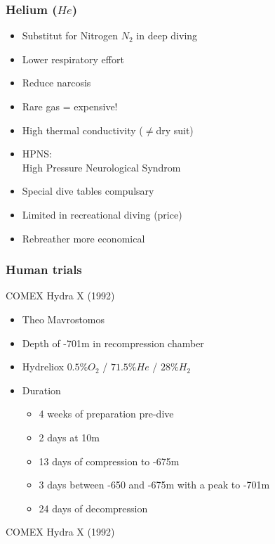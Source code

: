 \documentclass[aspectratio=1610,english,12pt]{beamer}
\begin{document}
\subsubsection{Helium ($He$)}
\begin{frame}{\insertsubsubsection}
	\begin{itemize}
		\item Substitut for Nitrogen $N_2$ in deep diving
		\item Lower respiratory effort
		\item Reduce narcosis
		\item Rare gas = expensive!
		\item High thermal conductivity ($\ne$dry suit)
		\item HPNS:\\High Pressure Neurological Syndrom
		\item Special dive tables compulsary
		\item Limited in recreational diving (price)
		\item Rebreather more economical
	\end{itemize}
\end{frame}

\subsubsection{Human trials}
\begin{frame}{COMEX Hydra X (1992)}
	\begin{itemize}
		\item Theo Mavrostomos
		\item Depth of -701m in recompression chamber
		\item Hydreliox $0.5\% O_2$ / $71.5\% He$ / $28\% H_2$
		\item Duration
		\begin{itemize}
			\item 4 weeks of preparation pre-dive
			\item 2 days at 10m
			\item 13 days of compression to -675m
			\item 3 days between -650 and -675m with a peak to -701m
			\item 24 days of decompression
		\end{itemize}
	\end{itemize}
\end{frame}

\begin{frame}{COMEX Hydra X (1992)}
\end{frame}
\end{document}
